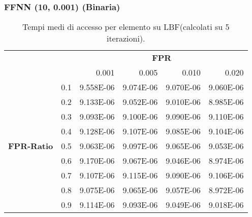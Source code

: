 \documentclass[4apaper,11pt]{report}
\begin{document}
    \subsubsection{FFNN (10, 0.001) (Binaria)}
    \begin{table}[H]
        \centering
        \begin{tabular}{llrrrr}
        \toprule
        {} & & \multicolumn{4}{c}{\textbf{FPR}}\\
        {} & &    0.001 &     0.005 &     0.010 &     0.020 \\
        \midrule
        \multirow{9}{*}{\textbf{FPR-Ratio}} & 0.1& 9.558E-06 & 9.074E-06 & 9.070E-06 & 9.060E-06 \\
        &0.2& 9.133E-06 & 9.052E-06 & 9.010E-06 & 8.985E-06 \\
        &0.3& 9.093E-06 & 9.100E-06 & 9.090E-06 & 9.110E-06 \\
        &0.4& 9.128E-06 & 9.107E-06 & 9.085E-06 & 9.104E-06 \\
        &0.5& 9.063E-06 & 9.097E-06 & 9.065E-06 & 9.053E-06 \\
        &0.6& 9.170E-06 & 9.067E-06 & 9.046E-06 & 8.974E-06 \\
        &0.7& 9.107E-06 & 9.115E-06 & 9.090E-06 & 9.106E-06 \\
        &0.8& 9.075E-06 & 9.065E-06 & 9.057E-06 & 8.972E-06 \\
        &0.9& 9.114E-06 & 9.093E-06 & 9.049E-06 & 9.018E-06 \\
        \bottomrule
        \end{tabular}
        \caption{Tempi medi di accesso per elemento su LBF(calcolati su 5 iterazioni).}
    \end{table}
\end{document}
